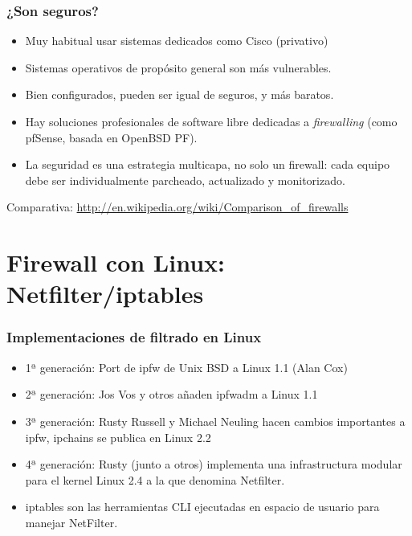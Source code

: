 \documentclass{beamer}
\begin{document}

\begin{frame}
\frametitle{¿Son seguros?}

\begin{itemize}
\item Muy habitual usar sistemas dedicados como Cisco (privativo)
\item Sistemas operativos de propósito general son más vulnerables.
\item Bien configurados, pueden ser igual de seguros, y más baratos.
\item Hay soluciones profesionales de software libre dedicadas a \textit{firewalling} (como \alert{pfSense}, basada en OpenBSD PF).
\item La seguridad es una estrategia multicapa, no solo un firewall: cada equipo debe ser individualmente parcheado, actualizado y monitorizado.
\end{itemize}

Comparativa: \url{http://en.wikipedia.org/wiki/Comparison_of_firewalls}

\end{frame}


\section{Firewall con Linux: Netfilter/iptables}


\begin{frame}
\frametitle{Implementaciones de filtrado en Linux}

\begin{itemize}
\item \alert{1ª generación:} Port de ipfw de Unix BSD a Linux 1.1 (Alan Cox)
\item \alert{2ª generación:} Jos Vos y otros añaden ipfwadm a Linux 1.1
\item \alert{3ª generación:} Rusty Russell y Michael Neuling hacen cambios importantes a ipfw, ipchains se publica en Linux 2.2
\item \alert{4ª generación:} Rusty (junto a otros) implementa una infrastructura modular para el kernel Linux 2.4 a la que denomina \alert{Netfilter}.
\item \alert{iptables} son las herramientas CLI ejecutadas en espacio de usuario para manejar NetFilter.
\end{itemize}

\end{frame}
\end{document}
